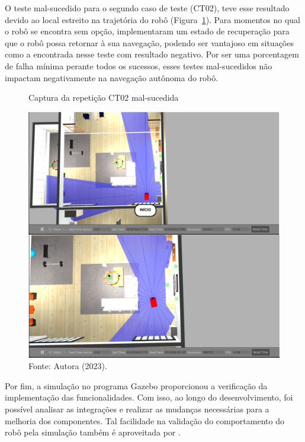O teste mal-sucedido para o segundo caso de teste (CT02), teve esse resultado devido ao local estreito na trajetória do robô (Figura~\ref{fig:erroCT02}). Para momentos no qual o robô se encontra sem opção, \citet{lidarRGBD} implementaram um estado de recuperação para que o robô possa retornar à sua navegação, podendo ser vantajoso em situações como a encontrada nesse teste com resultado negativo. Por ser uma porcentagem de falha mínima perante todos os sucessos, esses testes mal-sucedidos não impactam negativamente na navegação autônoma do robô. 

\begin{figure}[H]
    \centering
    \caption{Captura da repetição CT02 mal-sucedida}
    \includegraphics[scale=0.3]{ct02_4.png}
    \caption*{Fonte: Autora (2023).}
    \label{fig:erroCT02}
\end{figure}

Por fim, a simulação no programa Gazebo proporcionou a verificação da implementação das funcionalidades. Com isso, ao longo do desenvolvimento, foi possível analisar as integrações e realizar as mudanças necessárias para a melhoria dos componentes. Tal facilidade na validação do comportamento do robô pela simulação também é aproveitada por \citet{navegacaoSlam:2022, dpoom, lidarRGBD}. 
